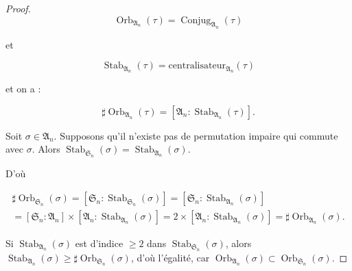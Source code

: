 \documentclass[french]{book}
\theoremstyle{definition}
\theoremstyle{remark}
\begin{document}
\begin{proof}
  \[\operatorname{Orb}_{\mathfrak{A}_n}(\tau) = \operatorname{Conjug}_{\mathfrak{A}_n}(\tau)\]

  et

  \[\operatorname{Stab}_{\mathfrak{A}_n}(\tau) = \text{centralisateur}_{\mathfrak{A}_n}(\tau)\]

  et on a :

  \[\sharp\operatorname{Orb}_{\mathfrak{A}_n}(\tau) = [\mathfrak{A}_n : \operatorname{Stab}_{\mathfrak{A}_n}(\tau)].\]

  Soit \(\sigma \in \mathfrak{A}_n\). Supposons qu'il n'existe pas de permutation impaire qui commute avec \(\sigma\). Alors \(\operatorname{Stab}_{\mathfrak{S}_n}(\sigma) = \operatorname{Stab}_{\mathfrak{A}_n}(\sigma)\).

  D'où

  \begin{gather*}
    \sharp\operatorname{Orb}_{\mathfrak{S}_n}(\sigma) = [\mathfrak{S}_n : \operatorname{Stab}_{\mathfrak{S}_n}(\sigma)] = [\mathfrak{S}_{n} : \operatorname{Stab}_{\mathfrak{A}_n}(\sigma)] \\
    = [\mathfrak{S}_n : \mathfrak{A}_n] \times [\mathfrak{A}_n : \operatorname{Stab}_{\mathfrak{A}_n}(\sigma)] = 2 \times [\mathfrak{A}_n : \operatorname{Stab}_{\mathfrak{A}_n}(\sigma)] = \sharp\operatorname{Orb}_{\mathfrak{A}_n}(\sigma).
  \end{gather*}

  Si \(\operatorname{Stab}_{\mathfrak{A}_n}(\sigma)\) est d'indice \(\geq  2\) dans \(\operatorname{Stab}_{\mathfrak{S}_n}(\sigma)\), alors \(\operatorname{Stab}_{\mathfrak{A}_n}(\sigma) \geq  \sharp \operatorname{Orb}_{\mathfrak{S}_n}(\sigma)\), d'où l'égalité, car \(\operatorname{Orb}_{\mathfrak{A}_n}(\sigma) \subset \operatorname{Orb}_{\mathfrak{S}_n}(\sigma)\).
\end{proof}
\end{document}
